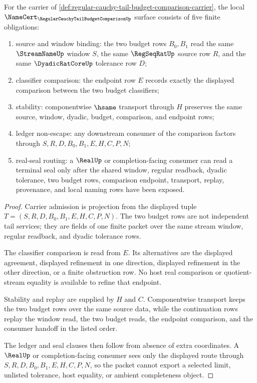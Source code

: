 \begin{theorem}
\label{thm:regular-cauchy-tail-budget-comparison-namecert-obligations}
For the carrier of \autoref{def:regular-cauchy-tail-budget-comparison-carrier}, the local $\NameCert_{\RegularCauchyTailBudgetComparisonUp}$ surface consists of five finite obligations:
\begin{enumerate}
\item source and window binding: the two budget rows $B_0,B_1$ read the same $\StreamNameUp$ window $S$, the same $\RegSeqRatUp$ source row $R$, and the same $\DyadicRatCoreUp$ tolerance row $D$;
\item classifier comparison: the endpoint row $E$ records exactly the displayed comparison between the two budget classifiers;
\item stability: componentwise $\hsame$ transport through $H$ preserves the same source, window, dyadic, budget, comparison, and endpoint rows;
\item ledger non-escape: any downstream consumer of the comparison factors through $S,R,D,B_0,B_1,E,H,C,P,N$;
\item real-seal routing: a $\RealUp$ or completion-facing consumer can read a terminal seal only after the shared window, regular readback, dyadic tolerance, two budget rows, comparison endpoint, transport, replay, provenance, and local naming rows have been exposed.
\end{enumerate}
\end{theorem}
\begin{proof}
Carrier admission is projection from the displayed tuple $T=(S,R,D,B_0,B_1,E,H,C,P,N)$. The two budget rows are not independent tail services; they are fields of one finite packet over the same stream window, regular readback, and dyadic tolerance rows.

The classifier comparison is read from $E$. Its alternatives are the displayed agreement, displayed refinement in one direction, displayed refinement in the other direction, or a finite obstruction row. No host real comparison or quotient-stream equality is available to refine that endpoint.

Stability and replay are supplied by $H$ and $C$. Componentwise transport keeps the two budget rows over the same source data, while the continuation rows replay the window read, the two budget reads, the endpoint comparison, and the consumer handoff in the listed order.

The ledger and seal clauses then follow from absence of extra coordinates. A $\RealUp$ or completion-facing consumer sees only the displayed route through $S,R,D,B_0,B_1,E,H,C,P,N$, so the packet cannot export a selected limit, unlisted tolerance, host equality, or ambient completeness object.
\end{proof}

